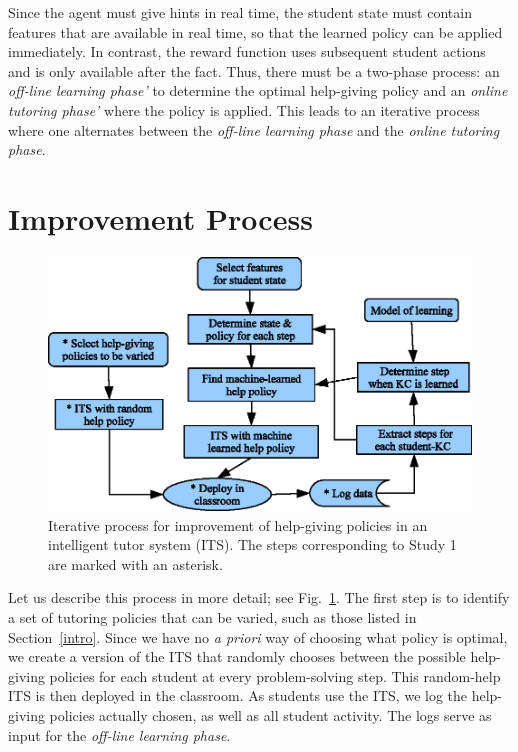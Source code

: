 \documentclass{edm_template}
\begin{document}
Since the agent must give hints in real time, the student state
must contain features that are available in real time, so that
the learned policy can be applied immediately.  In contrast,
the reward function uses subsequent student actions and is only
available after the fact.  Thus, there must be a two-phase process:
an {\em off-line learning phase'} to determine the optimal help-giving 
policy and an {\em online tutoring phase'} where the policy is applied.
This leads to an iterative process where one alternates between 
the {\em off-line learning phase} and the {\em online tutoring phase}.

\section{Improvement Process}
%
%
%
\begin{figure}
\centering    \includegraphics{process}
\caption{Iterative process for improvement of help-giving policies in
  an intelligent  tutor system (ITS).  The steps corresponding to Study 1 are marked
  with an asterisk.} \label{process}
\end{figure}

\label{improvement}

Let us describe this process in more detail; see Fig.~\ref{process}.  The first
step is to identify a set of tutoring policies that can be varied,
such as those listed in Section~\ref{intro}.  Since we have no {\em a priori}
way of choosing what policy is optimal, we create a version of the ITS
that randomly chooses between the possible help-giving policies for each student
at every problem-solving step.  This random-help ITS is then deployed
in the classroom.  As students use the ITS, we log the help-giving policies actually chosen, as well
as all student activity.  The logs serve as input for the
{\em off-line learning phase}.
\end{document}
